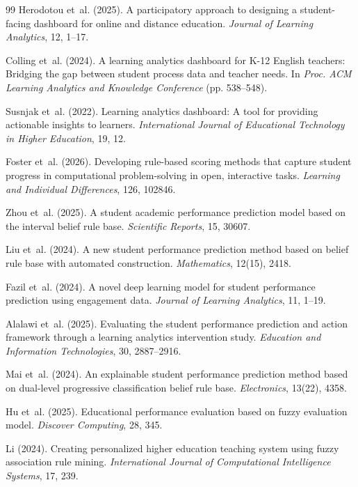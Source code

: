 \documentclass[12pt]{article}
\begin{document}
\begin{thebibliography}{99}
 Herodotou et~al. (2025). A participatory approach to designing a student-facing dashboard for online and distance education. \textit{Journal of Learning Analytics}, 12, 1--17.

 Colling et~al. (2024). A learning analytics dashboard for K-12 English teachers: Bridging the gap between student process data and teacher needs. In \textit{Proc. ACM Learning Analytics and Knowledge Conference} (pp. 538--548).

 Susnjak et~al. (2022). Learning analytics dashboard: A tool for providing actionable insights to learners. \textit{International Journal of Educational Technology in Higher Education}, 19, 12.

 Foster et~al. (2026). Developing rule-based scoring methods that capture student progress in computational problem-solving in open, interactive tasks. \textit{Learning and Individual Differences}, 126, 102846.

 Zhou et~al. (2025). A student academic performance prediction model based on the interval belief rule base. \textit{Scientific Reports}, 15, 30607.

 Liu et~al. (2024). A new student performance prediction method based on belief rule base with automated construction. \textit{Mathematics}, 12(15), 2418.

 Fazil et~al. (2024). A novel deep learning model for student performance prediction using engagement data. \textit{Journal of Learning Analytics}, 11, 1--19.

 Alalawi et~al. (2025). Evaluating the student performance prediction and action framework through a learning analytics intervention study. \textit{Education and Information Technologies}, 30, 2887--2916.

 Mai et~al. (2024). An explainable student performance prediction method based on dual-level progressive classification belief rule base. \textit{Electronics}, 13(22), 4358.

 Hu et~al. (2025). Educational performance evaluation based on fuzzy evaluation model. \textit{Discover Computing}, 28, 345.

 Li (2024). Creating personalized higher education teaching system using fuzzy association rule mining. \textit{International Journal of Computational Intelligence Systems}, 17, 239.


\end{thebibliography}
\end{document}
